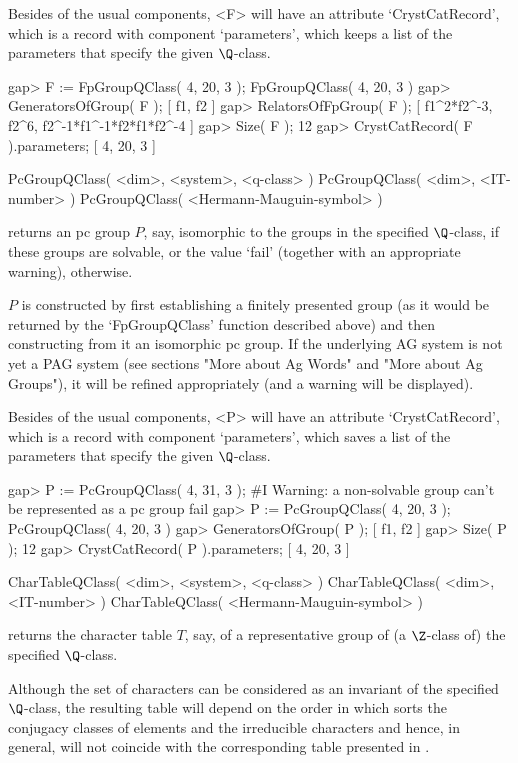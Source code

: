 Besides  of the usual components,  <F> will have an attribute
`CrystCatRecord', which is a record with component
`parameters', which keeps a list of the parameters
that specify the given $\Q$-class.

\beginexample
gap> F := FpGroupQClass( 4, 20, 3 );
FpGroupQClass( 4, 20, 3 )
gap> GeneratorsOfGroup( F );
[ f1, f2 ]
gap> RelatorsOfFpGroup( F );
[ f1^2*f2^-3, f2^6, f2^-1*f1^-1*f2*f1*f2^-4 ]
gap> Size( F );
12
gap> CrystCatRecord( F ).parameters;
[ 4, 20, 3 ]
\endexample

\>PcGroupQClass( <dim>, <system>, <q-class> )
\>PcGroupQClass( <dim>, <IT-number> )
\>PcGroupQClass( <Hermann-Mauguin-symbol> )

returns an pc group $P$, say, isomorphic to the groups in the
specified $\Q$-class, if these groups are solvable, or the value
`fail' (together with an appropriate warning), otherwise.

$P$ is constructed by first establishing a finitely presented group
(as it would be returned by the `FpGroupQClass' function described
above) and then constructing from it an isomorphic pc group.  If the
underlying AG system is not yet a PAG system (see sections "More about
Ag Words" and "More about Ag Groups"), it will be refined
appropriately (and a warning will be displayed).

Besides of the usual components, <P> will have an attribute
`CrystCatRecord', which is a record with component
`parameters', which saves a list of the parameters that specify 
the given $\Q$-class.

\beginexample
gap> P := PcGroupQClass( 4, 31, 3 );
#I  Warning: a non-solvable group can't be represented as a pc group
fail
gap> P := PcGroupQClass( 4, 20, 3 );
PcGroupQClass( 4, 20, 3 )
gap> GeneratorsOfGroup( P );
[ f1, f2 ]
gap> Size( P );
12
gap> CrystCatRecord( P ).parameters;
[ 4, 20, 3 ]
\endexample

\>CharTableQClass( <dim>, <system>, <q-class> )
\>CharTableQClass( <dim>, <IT-number> )
\>CharTableQClass( <Hermann-Mauguin-symbol> )

returns the character table $T$, say, of a representative group of (a
$\Z$-class of) the specified $\Q$-class.

Although the set of characters  can be considered as  an invariant of the
specified $\Q$-class,  the resulting  table  will depend on  the order in
which {\GAP} sorts the conjugacy classes of  elements and the irreducible
characters  and    hence,  in  general,   will  not   coincide  with  the
corresponding table presented in \cite{BBNWZ78}.

